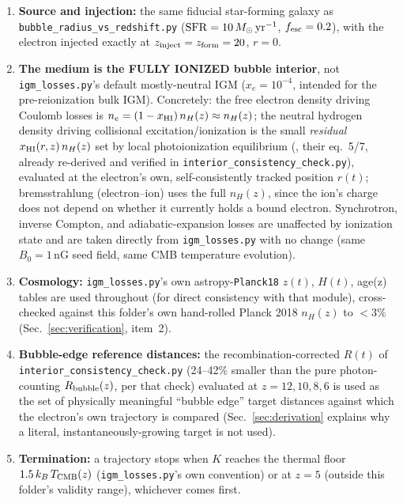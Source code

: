 \documentclass[11pt,a4paper]{article}
\newcommand{\Msun}{\,M_\odot}
\begin{document}
\begin{enumerate}
\item \textbf{Source and injection:} the same fiducial star-forming galaxy as
      \texttt{bubble\_radius\_vs\_redshift.py} ($\mathrm{SFR}=10\Msun\,{\rm yr^{-1}}$, $f_{\rm esc}=0.2$),
      with the electron injected exactly at $z_{\rm inject}=z_{\rm form}=20$, $r=0$.
\item \textbf{The medium is the FULLY IONIZED bubble interior}, not \texttt{igm\_losses.py}'s default
      mostly-neutral IGM ($x_e=10^{-4}$, intended for the pre-reionization bulk IGM). Concretely: the free
      electron density driving Coulomb losses is $n_e=(1-x_{\rm HI})\,n_H(z)\approx n_H(z)$; the neutral
      hydrogen density driving collisional excitation/ionization is the small \emph{residual} $x_{\rm
      HI}(r,z)\,n_H(z)$ set by local photoionization equilibrium (\citealt{Cen2000}, their eq.~5/7,
      already re-derived and verified in \texttt{interior\_consistency\_check.py}), evaluated at the
      electron's own, self-consistently tracked position $r(t)$; bremsstrahlung (electron--ion) uses the
      full $n_H(z)$, since the ion's charge does not depend on whether it currently holds a bound electron.
      Synchrotron, inverse Compton, and adiabatic-expansion losses are unaffected by ionization state and
      are taken directly from \texttt{igm\_losses.py} with no change (same $B_0=1\,$nG seed field, same CMB
      temperature evolution).
\item \textbf{Cosmology:} \texttt{igm\_losses.py}'s own astropy-\texttt{Planck18} $z(t)$, $H(t)$, age(z)
      tables are used throughout (for direct consistency with that module), cross-checked against this
      folder's own hand-rolled Planck 2018 \citep{Planck2018VI} $n_H(z)$ to $<3\%$
      (Sec.~\ref{sec:verification}, item~2).
\item \textbf{Bubble-edge reference distances:} the recombination-corrected $R(t)$ of
      \texttt{interior\_consistency\_check.py} (24--42\% smaller than the pure photon-counting
      $R_{\rm bubble}(z)$, per that check) evaluated at $z=12,10,8,6$ is used as the set of physically
      meaningful ``bubble edge'' target distances against which the electron's own trajectory is compared
      (Sec.~\ref{sec:derivation} explains why a literal, instantaneously-growing target is not used).
\item \textbf{Termination:} a trajectory stops when $K$ reaches the thermal floor
      $1.5\,k_B\,T_{\rm CMB}(z)$ (\texttt{igm\_losses.py}'s own convention) or at $z=5$ (outside this
      folder's validity range), whichever comes first.
\end{enumerate}
\end{document}
